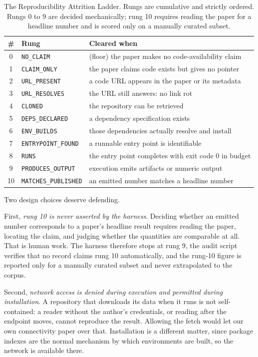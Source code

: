 \begin{table}[H]
\centering
\caption{The Reproducibility Attrition Ladder. Rungs are cumulative and strictly
ordered. Rungs 0 to 9 are decided mechanically; rung 10 requires reading the paper
for a headline number and is scored only on a manually curated subset.}
\label{tab:ladder}
\small
\begin{tabular}{@{}clp{8.2cm}@{}}
\toprule
\# & Rung & Cleared when \\
\midrule
0  & \texttt{NO\_CLAIM}          & (floor) the paper makes no code-availability claim \\
1  & \texttt{CLAIM\_ONLY}        & the paper claims code exists but gives no pointer \\
2  & \texttt{URL\_PRESENT}       & a code URL appears in the paper or its metadata \\
3  & \texttt{URL\_RESOLVES}      & the URL still answers: no link rot \\
4  & \texttt{CLONED}             & the repository can be retrieved \\
5  & \texttt{DEPS\_DECLARED}     & a dependency specification exists \\
6  & \texttt{ENV\_BUILDS}        & those dependencies actually resolve and install \\
7  & \texttt{ENTRYPOINT\_FOUND}  & a runnable entry point is identifiable \\
8  & \texttt{RUNS}               & the entry point completes with exit code 0 in budget \\
9  & \texttt{PRODUCES\_OUTPUT}   & execution emits artifacts or numeric output \\
10 & \texttt{MATCHES\_PUBLISHED} & an emitted number matches a headline number \\
\bottomrule
\end{tabular}
\end{table}

Two design choices deserve defending.

First, \emph{rung 10 is never asserted by the harness}. Deciding whether an
emitted number corresponds to a paper's headline result requires reading the
paper, locating the claim, and judging whether the quantities are comparable at
all. That is human work. The harness therefore stops at rung 9, the audit script
verifies that no record claims rung 10 automatically, and the rung-10 figure is
reported only for a manually curated subset and never extrapolated to the
corpus.

Second, \emph{network access is denied during execution and permitted during
installation}. A repository that downloads its data when it runs is not
self-contained: a reader without the author's credentials, or reading after the
endpoint moves, cannot reproduce the result. Allowing the fetch would let our own
connectivity paper over that. Installation is a different matter, since package
indexes are the normal mechanism by which environments are built, so the
network is available there.

